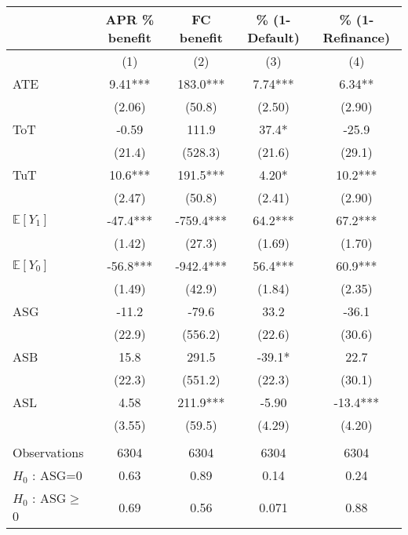 \begin{tabular}{lcccc}
\toprule
      & APR \% benefit & FC benefit & \% (1-Default) & \% (1-Refinance) \\
\midrule
      & (1)   & (2)   & (3)   & (4) \\
\midrule
\midrule
ATE   & 9.41*** & 183.0*** & 7.74*** & 6.34** \\
      & (2.06) & (50.8) & (2.50) & (2.90) \\
ToT   & -0.59 & 111.9 & 37.4* & -25.9 \\
      & (21.4) & (528.3) & (21.6) & (29.1) \\
TuT   & 10.6*** & 191.5*** & 4.20* & 10.2*** \\
      & (2.47) & (50.8) & (2.41) & (2.90) \\
$\mathbb{E}[Y_1]$ & -47.4*** & -759.4*** & 64.2*** & 67.2*** \\
      & (1.42) & (27.3) & (1.69) & (1.70) \\
$\mathbb{E}[Y_0]$ & -56.8*** & -942.4*** & 56.4*** & 60.9*** \\
      & (1.49) & (42.9) & (1.84) & (2.35) \\
\midrule
ASG   & -11.2 & -79.6 & 33.2  & -36.1 \\
      & (22.9) & (556.2) & (22.6) & (30.6) \\
ASB   & 15.8  & 291.5 & -39.1* & 22.7 \\
      & (22.3) & (551.2) & (22.3) & (30.1) \\
ASL   & 4.58  & 211.9*** & -5.90 & -13.4*** \\
      & (3.55) & (59.5) & (4.29) & (4.20) \\
      &       &       &       &  \\
\midrule
Observations & 6304  & 6304  & 6304  & 6304 \\
$H_0$ : ASG=0 & 0.63  & 0.89  & 0.14  & 0.24 \\
$H_0$ : ASG$\geq$ 0 & 0.69  & 0.56  & 0.071 & 0.88 \\
\bottomrule
\bottomrule
\end{tabular}%

